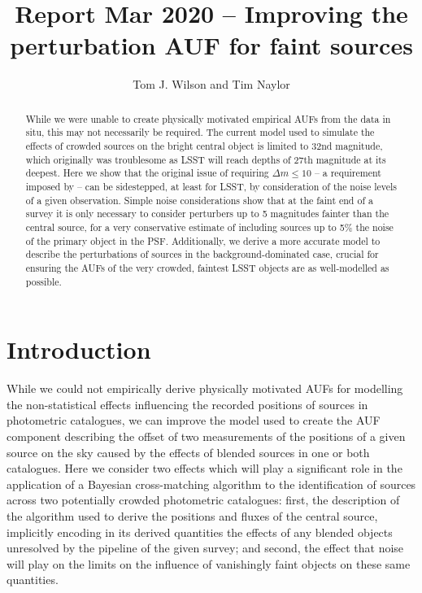 \documentclass[fleqn,usenatbib]{mnras}
\title[]{Report Mar 2020 – Improving the perturbation AUF for faint sources}
\author[Tom J. Wilson and Tim Naylor]{
Tom J. Wilson
and Tim Naylor
\\
}
\date{}
\begin{document}
\label{firstpage}
\pagerange{\pageref{firstpage}--\pageref{lastpage}}
\maketitle
\begin{abstract}

While we were unable to create physically motivated empirical AUFs from the data in situ, this may not necessarily be required. The current model used to simulate the effects of crowded sources on the bright central object is limited to 32nd magnitude, which originally was troublesome as LSST will reach depths of 27th magnitude at its deepest. Here we show that the original issue of requiring $\Delta m \leq 10$ -- a requirement imposed by \citet{2018MNRAS.481.2148W} -- can be sidestepped, at least for LSST, by consideration of the noise levels of a given observation. Simple noise considerations show that at the faint end of a survey it is only necessary to consider perturbers up to 5 magnitudes fainter than the central source, for a very conservative estimate of including sources up to 5\% the noise of the primary object in the PSF. Additionally, we derive a more accurate model to describe the perturbations of sources in the background-dominated case, crucial for ensuring the AUFs of the very crowded, faintest LSST objects are as well-modelled as possible.

\end{abstract}

\section{Introduction}
While we could not empirically derive physically motivated AUFs for modelling the non-statistical effects influencing the recorded positions of sources in photometric catalogues, we can improve the model used to create the AUF component describing the offset of two measurements of the positions of a given source on the sky caused by the effects of blended sources in one or both catalogues. Here we consider two effects which will play a significant role in the application of a Bayesian cross-matching algorithm to the identification of sources across two potentially crowded photometric catalogues: first, the description of the algorithm used to derive the positions and fluxes of the central source, implicitly encoding in its derived quantities the effects of any blended objects unresolved by the pipeline of the given survey; and second, the effect that noise will play on the limits on the influence of vanishingly faint objects on these same quantities.
\end{document}
